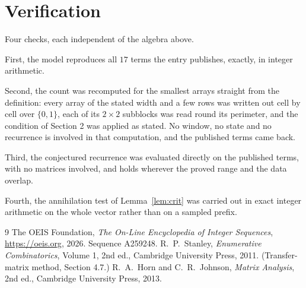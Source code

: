 \documentclass[11pt,a4paper]{article}
\theoremstyle{plain}
\theoremstyle{definition}
\begin{document}
\section{Verification}

Four checks, each independent of the algebra above.

First, the model reproduces all $17$ terms the entry publishes, exactly, in integer
arithmetic.

Second, the count was recomputed for the smallest arrays straight from the definition: every
array of the stated width and a few rows was written out cell by cell over $\{0,1\}$, each of
its $2\times2$ subblocks was read round its perimeter, and the condition of Section 2 was
applied as stated. No window, no state and no recurrence is involved in that computation, and
the published terms came back.

Third, the conjectured recurrence was evaluated directly on the published terms, with no
matrices involved, and holds wherever the proved range and the data overlap.

Fourth, the annihilation test of Lemma~\ref{lem:crit} was carried out in exact integer
arithmetic on the whole vector rather than on a sampled prefix.

\begin{thebibliography}{9}
 The OEIS Foundation, \emph{The On-Line Encyclopedia of Integer
Sequences}, \url{https://oeis.org}, 2026. Sequence A259248.
 R.~P.~Stanley, \emph{Enumerative Combinatorics}, Volume 1, 2nd ed.,
Cambridge University Press, 2011. (Transfer-matrix method, Section 4.7.)
 R.~A.~Horn and C.~R.~Johnson, \emph{Matrix Analysis}, 2nd ed., Cambridge
University Press, 2013.
\end{thebibliography}
\end{document}
